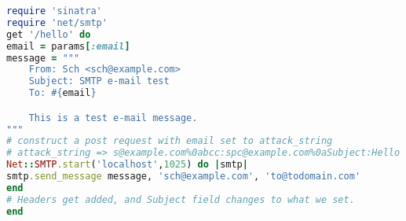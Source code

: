 \begin{lstlisting}[language=Ruby,caption={Ruby program with e-mail
      header injection vulnerability.},label={code:rubyemi}, float]
require 'sinatra'
require 'net/smtp'
get '/hello' do
email = params[:email]
message = """
    From: Sch <sch@example.com>
    Subject: SMTP e-mail test
    To: #{email}

    This is a test e-mail message.
"""
# construct a post request with email set to attack_string
# attack_string => s@example.com%0abcc:spc@example.com%0aSubject:Hello
Net::SMTP.start('localhost',1025) do |smtp|
smtp.send_message message, 'sch@example.com', 'to@todomain.com'
end
# Headers get added, and Subject field changes to what we set.
end
\end{lstlisting}
